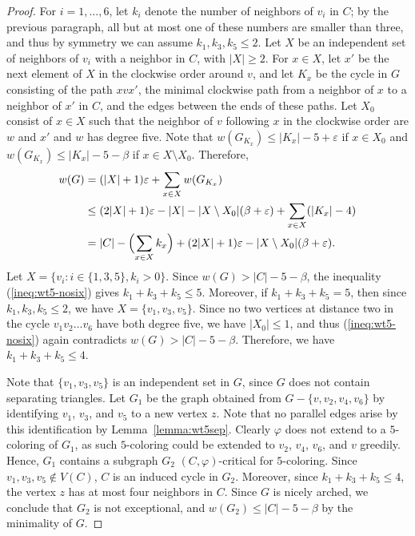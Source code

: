\documentclass[12pt,twoside,openright,a4paper]{book}
\begin{document}
\begin{proof}
For $i=1,\ldots,6$, let $k_i$ denote the number of neighbors of $v_i$ in $C$; by the previous
paragraph, all but at most one of these numbers are smaller than three, and thus by symmetry we can assume
$k_1,k_3,k_5\le 2$.  Let $X$ be an independent set of neighbors of $v_i$ with a neighbor in $C$, with $|X|\ge 2$.
For $x\in X$, let $x'$ be the next element of $X$ in the clockwise order around $v$,
and let $K_x$ be the cycle in $G$ consisting of the path $xvx'$, the minimal clockwise
path from a neighbor of $x$ to a neighbor of $x'$ in $C$, and the edges between the ends of these
paths.  Let $X_0$ consist of $x\in X$ such that the neighbor of $v$ following $x$ in the clockwise
order are $w$ and $x'$ and $w$ has degree five.  Note that $w(G_{K_x})\le |K_x|-5+\varepsilon$ if $x\in X_0$
and $w(G_{K_x})\le |K_x|-5-\beta$ if $x\in X\setminus X_0$.  Therefore,
\begin{align}
w(G)&=(|X|+1)\varepsilon+\sum_{x\in X} w(G_{K_x})\nonumber\\
&\le (2|X|+1)\varepsilon-|X|-|X\setminus X_0|(\beta+\varepsilon)+\sum_{x\in X}(|K_x|-4)\nonumber\\
&=|C|-\Bigl(\sum_{x\in X} k_x\Bigr)+(2|X|+1)\varepsilon-|X\setminus X_0|(\beta+\varepsilon).\label{ineq:wt5-nosix}
\end{align}
Let $X=\{v_i:i\in\{1,3,5\}, k_i>0\}$.  Since $w(G)>|C|-5-\beta$, the inequality (\ref{ineq:wt5-nosix})
gives $k_1+k_3+k_5\le 5$.  Moreover, if $k_1+k_3+k_5=5$, then since $k_1,k_3,k_5\le 2$, we have $X=\{v_1,v_3,v_5\}$.
Since no two vertices at distance two in the cycle $v_1v_2\ldots v_6$ have both degree five,
we have $|X_0|\le 1$, and thus (\ref{ineq:wt5-nosix}) again contradicts $w(G)>|C|-5-\beta$.
Therefore, we have $k_1+k_3+k_5\le 4$.

Note that $\{v_1,v_3,v_5\}$ is an independent set in $G$, since $G$ does not contain separating triangles.
Let $G_1$ be the graph obtained from $G-\{v,v_2,v_4,v_6\}$ by identifying $v_1$, $v_3$, and $v_5$ to a new vertex $z$.
Note that no parallel edges arise by this identification by Lemma~\ref{lemma:wt5sep}.
Clearly $\varphi$ does not extend to a $5$-coloring of $G_1$, as such $5$-coloring could be extended
to $v_2$, $v_4$, $v_6$, and $v$ greedily.  Hence, $G_1$ contains a subgraph $G_2$ $(C,\varphi)$-critical for $5$-coloring.
Since $v_1,v_3,v_5\not\in V(C)$, $C$ is an induced cycle in $G_2$.  Moreover, since $k_1+k_3+k_5\le 4$,
the vertex $z$ has at most four neighbors in $C$.  Since $G$ is nicely arched, we conclude that $G_2$ is not
exceptional, and $w(G_2)\le |C|-5-\beta$ by the minimality of $G$.


\end{proof}
\end{document}
